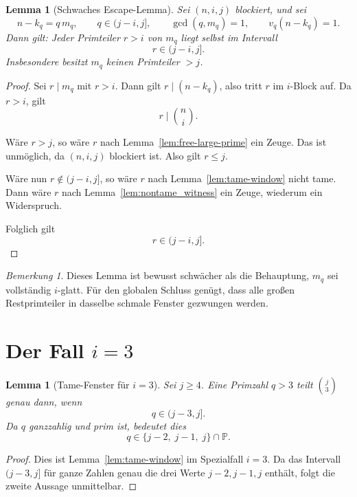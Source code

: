 \documentclass[12pt,a4paper]{article}
\theoremstyle{plain}
\newtheorem{lemma}[theorem]{Lemma}
\theoremstyle{definition}
\theoremstyle{remark}
\newtheorem{remark}[theorem]{Bemerkung}
\begin{document}
	\begin{lemma}[Schwaches Escape-Lemma]
		\label{lem:weak-escape}
		Sei \((n,i,j)\) blockiert, und sei
		\[
		n-k_q=q\,m_q,\qquad q\in(j-i,j],\qquad \gcd(q,m_q)=1,\qquad v_q(n-k_q)=1.
		\]
		Dann gilt: Jeder Primteiler \(r>i\) von \(m_q\) liegt selbst im Intervall
		\[
		r\in(j-i,j].
		\]
		Insbesondere besitzt \(m_q\) keinen Primteiler \(>j\).
	\end{lemma}
	
	\begin{proof}
		Sei \(r\mid m_q\) mit \(r>i\). Dann gilt \(r\mid(n-k_q)\), also tritt \(r\) im \(i\)-Block auf. Da \(r>i\), gilt
		\[
		r\mid \binom ni.
		\]
		
		Wäre \(r>j\), so wäre \(r\) nach Lemma~\ref{lem:free-large-prime} ein Zeuge. Das ist unmöglich, da \((n,i,j)\) blockiert ist. Also gilt \(r\le j\).
		
		Wäre nun \(r\notin(j-i,j]\), so wäre \(r\) nach Lemma~\ref{lem:tame-window} nicht tame. Dann wäre \(r\) nach Lemma~\ref{lem:nontame_witness} ein Zeuge, wiederum ein Widerspruch.
		
		Folglich gilt
		\[
		r\in(j-i,j].
		\]
	\end{proof}
	
	\begin{remark}
		Dieses Lemma ist bewusst schwächer als die Behauptung, \(m_q\) sei vollständig \(i\)-glatt. Für den globalen Schluss genügt, dass alle großen Restprimteiler in dasselbe schmale Fenster gezwungen werden.
	\end{remark}
	
	\section{Der Fall \(i=3\)}
	
	\begin{lemma}[Tame-Fenster für \(i=3\)]
		\label{lem:tame_i3}
		Sei \(j\ge4\). Eine Primzahl \(q>3\) teilt \(\binom j3\) genau dann, wenn
		\[
		q\in(j-3,j].
		\]
		Da \(q\) ganzzahlig und prim ist, bedeutet dies
		\[
		q\in\{j-2,\;j-1,\;j\}\cap\mathbb P.
		\]
	\end{lemma}
	
	\begin{proof}
		Dies ist Lemma~\ref{lem:tame-window} im Spezialfall \(i=3\). Da das Intervall
		\((j-3,j]\) für ganze Zahlen genau die drei Werte \(j-2,j-1,j\) enthält, folgt die zweite Aussage unmittelbar.
	\end{proof}
	
\end{document}
